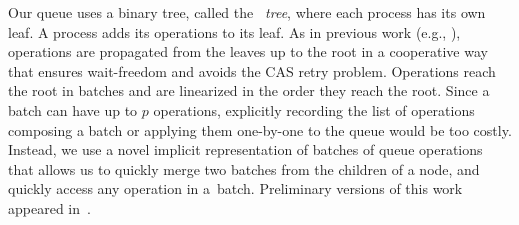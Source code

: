 Our queue uses a binary tree, called the \emph{\ordering\ tree}, where each process has its own leaf.
A process adds its operations to its leaf.
As in previous work (e.g., \cite{DBLP:conf/stoc/AfekDT95,DBLP:conf/fsttcs/JayantiP05}), operations are propagated from the leaves up to the root in a cooperative way that ensures wait-freedom
and avoids the CAS retry problem.
Operations reach the root in batches and are linearized in the order they reach the root.
Since a batch can have up to $p$ operations, explicitly recording the list of operations composing a batch
or applying them one-by-one to the queue would be too costly.
Instead, we use a novel implicit representation of batches
of queue operations that allows us to quickly merge two batches from the children of a node,
and quickly access any  operation in a~batch.
Preliminary versions of this work appeared in~\cite{Nad22,NR23}.
